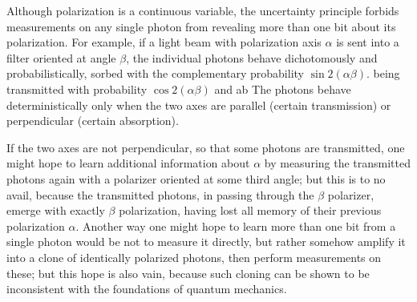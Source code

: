 Although polarization is a continuous variable, the uncertainty principle forbids measurements on any single photon from revealing more than one bit about its polarization. For example, if a light beam with polarization axis $\alpha$ is sent into a filter oriented at angle $\beta$, the individual photons behave dichotomously and probabilistically, sorbed with the complementary probability $\sin{2(\alpha \beta)}$. being transmitted with probability $\cos{2(\alpha \beta)}$ and ab The photons behave deterministically only when the two axes are parallel (certain transmission) or perpendicular (certain absorption). 

If the two axes are not perpendicular, so that some photons are transmitted, one might hope to learn additional information about $\alpha$ by measuring the transmitted photons again with a polarizer oriented at some third angle; but this is to no avail, because the transmitted photons, in passing through the $\beta$ polarizer, emerge with exactly $\beta$ polarization, having lost all memory of their previous polarization $\alpha$. Another way one might hope to learn more than one bit from a single photon would be not to measure it directly, but rather somehow amplify it into a clone of identically polarized photons, then perform measurements on these; but this hope is also vain, because such cloning can be shown to be inconsistent with the foundations of quantum mechanics\textcite{Wootters1982}.